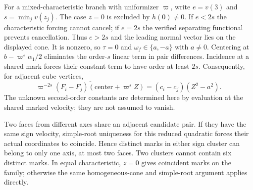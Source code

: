 For a mixed-characteristic branch with uniformizer $\varpi$, write $e=v(3)$ and
$s=\min_jv(z_j)$. The case $z=0$ is excluded by $h(0)\ne0$.
If $e<2s$ the characteristic forcing cannot cancel; if $e=2s$ the verified
separating functional prevents cancellation. Thus $e>2s$ and the leading
normal vector lies on the displayed cone. It is nonzero, so
$\tau=0$ and $\omega_f\in\{a,-a\}$ with $a\ne0$.
Centering at $b-\varpi^s\alpha_1/2$ eliminates the order-$s$ linear term in
pair differences. Incidence at a shared mark forces their constant term
to have order at least $2s$. Consequently, for adjacent cube vertices,
\[
 \overline{\varpi^{-2s}(F_i-F_j)(\mathrm{center}+\varpi^sZ)}
       =(c_i-c_j)(Z^2-a^2).
\]
The unknown second-order constants are determined here by evaluation at
the shared marked velocity; they are not assumed to vanish.

Two faces from different axes share an adjacent candidate pair. If they
have the same sign velocity, simple-root uniqueness for this reduced
quadratic forces their actual coordinates to coincide. Hence distinct
marks in either sign cluster can belong to only one axis, at most two
faces. Two clusters cannot contain six distinct marks. In equal
characteristic, $z=0$ gives coincident marks on the family; otherwise the
same homogeneous-cone and simple-root argument applies directly.
